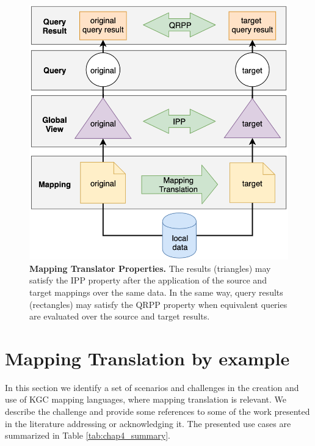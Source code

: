 \begin{figure}[!t]
    \centering
    \includegraphics[width=0.6\columnwidth]{./figures/mapping-translator.png}
    \caption[Mapping translator properties]{\textbf{Mapping Translator Properties.} The results (triangles) may satisfy the IPP property after the application of the source and target mappings over the same data. In the same way, query results (rectangles) may satisfy the QRPP property when equivalent queries are evaluated over the source and target results.}
    \label{fig:mt}
\end{figure}


\section{Mapping Translation by example}
In this section we identify a set of scenarios and challenges in the creation and use of KGC mapping languages, where mapping translation is relevant. We describe the challenge and provide some references to some of the work presented in the literature addressing or acknowledging it. The presented use cases are summarized in Table \ref{tab:chap4_summary}.

